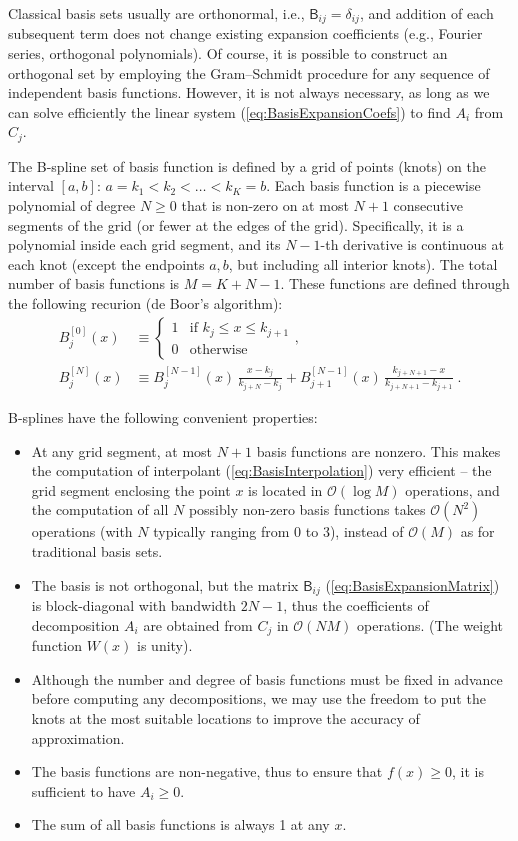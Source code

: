 \documentclass[12pt]{article}
\begin{document}
Classical basis sets usually are orthonormal, i.e., $\mathsf{B}_{ij} = \delta_{ij}$, and addition of each subsequent term does not change existing expansion coefficients (e.g., Fourier series, orthogonal polynomials). Of course, it is possible to construct an orthogonal set by employing the Gram--Schmidt procedure for any sequence of independent basis functions. However, it is not always necessary, as long as we can solve efficiently the linear system (\ref{eq:BasisExpansionCoefs}) to find $A_i$ from $C_j$.

The B-spline set of basis function is defined by a grid of points (knots) on the interval $[a,b]$: $a=k_1<k_2<\dots<k_K=b$. Each basis function is a piecewise polynomial of degree $N\ge 0$ that is non-zero on at most $N+1$ consecutive segments of the grid (or fewer at the edges of the grid). Specifically, it is a polynomial inside each grid segment, and its $N-1$-th derivative is continuous at each knot (except the endpoints $a,b$, but including all interior knots). The total number of basis functions is $M=K+N-1$. These functions are defined through the following recurion (de Boor's algorithm):
\begin{subequations}
\begin{align}
B^{[0]}_j(x) &\equiv \left\{ \begin{array}{ll} 1 &\mbox{if }k_j \le x \le k_{j+1} \\ 0 & \mbox{otherwise} \end{array} \right., \\
B^{[N]}_j(x) &\equiv B^{[N-1]}_j(x)\,\frac{x-k_j}{k_{j+N}-k_j} +
B^{[N-1]}_{j+1}(x)\,\frac{k_{j+N+1}-x}{k_{j+N+1}-k_{j+1}} \;.
\end{align}
\end{subequations}

B-splines have the following convenient properties:
\begin{itemize}
\item At any grid segment, at most $N+1$ basis functions are nonzero. This makes the computation of interpolant (\ref{eq:BasisInterpolation}) very efficient -- the grid segment enclosing the point $x$ is located in $\mathcal{O}(\log M)$ operations, and the computation of all $N$ possibly non-zero basis functions takes $\mathcal{O}(N^2)$ operations (with $N$ typically ranging from 0 to 3), instead of $\mathcal{O}(M)$ as for traditional basis sets.
\item The basis is not orthogonal, but the matrix $\mathsf{B}_{ij}$ (\ref{eq:BasisExpansionMatrix}) is block-diagonal with bandwidth $2N-1$, thus the coefficients of decomposition $A_i$ are obtained from $C_j$ in $\mathcal{O}(NM)$ operations. (The weight function $W(x)$ is unity).
\item Although the number and degree of basis functions must be fixed in advance before computing any decompositions, we may use the freedom to put the knots at the most suitable locations to improve the accuracy of approximation.
\item The basis functions are non-negative, thus to ensure that $f(x) \ge 0$, it is sufficient to have $A_i\ge 0$. 
\item The sum of all basis functions is always 1 at any $x$.
\end{itemize}
\end{document}

